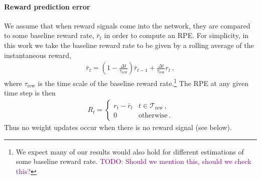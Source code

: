 \documentclass[
  journal=medium,
  manuscript=preprint,
  year=2026
]{aind-preprint}
\newcommand{\todo}[1]{\textcolor{purple}{TODO: #1}}
\begin{document}
\paragraph{Reward prediction error}
We assume that when reward signals come into the network, they are compared to some baseline reward rate, $\bar{r}_t$ in order to compute an RPE.
For simplicity, in this work we take the baseline reward rate to be given by a rolling average of the instantaneous reward,
\begin{align}
\label{eq:avg_reward}
    \bar{r}_t = \left(1-\frac{\Delta t}{\tau_\text{rew}}\right) \bar{r}_{t-1} + \frac{\Delta t}{\tau_\text{rew}} r_t\,,
\end{align}
where $\tau_\text{rew}$ is the time scale of the baseline reward rate.\footnote{
    We expect many of our results would also hold for different estimations of some baseline reward rate. \todo{Should we mention this, should we check this?}
}
The RPE at any given time step is then
\begin{align}
    R_t = \begin{cases}
        r_t - \bar{r}_t & t \in \mathcal{T}_\text{rew}\,, \\
        0 & \text{otherwise}\,.
    \end{cases}
\end{align}
Thus no weight updates occur when there is no reward signal (see below).
\end{document}
